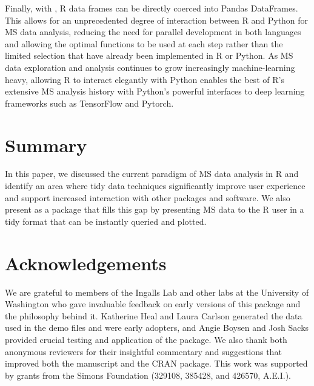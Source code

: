 
Finally, with , R data frames can be directly coerced into Pandas DataFrames. This allows for an unprecedented degree of interaction between R and Python for MS data analysis, reducing the need for parallel development in both languages and allowing the optimal functions to be used at each step rather than the limited selection that have already been implemented in R or Python. As MS data exploration and analysis continues to grow increasingly machine-learning heavy, allowing R to interact elegantly with Python enables the best of R's extensive MS analysis history with Python's powerful interfaces to deep learning frameworks such as TensorFlow and Pytorch.

\section{Summary}

In this paper, we discussed the current paradigm of MS data analysis in R and identify an area where tidy data techniques significantly improve user experience and support increased interaction with other packages and software. We also present  as a package that fills this gap by presenting MS data to the R user in a tidy format that can be instantly queried and plotted.

\section{Acknowledgements}

We are grateful to members of the Ingalls Lab and other labs at the University of Washington who gave invaluable feedback on early versions of this package and the philosophy behind it. Katherine Heal and Laura Carlson generated the data used in the demo files and were early adopters, and Angie Boysen and Josh Sacks provided crucial testing and application of the package. We also thank both anonymous reviewers for their insightful commentary and suggestions that improved both the manuscript and the CRAN package. This work was supported by grants from the Simons Foundation (329108, 385428, and 426570, A.E.I.).  

